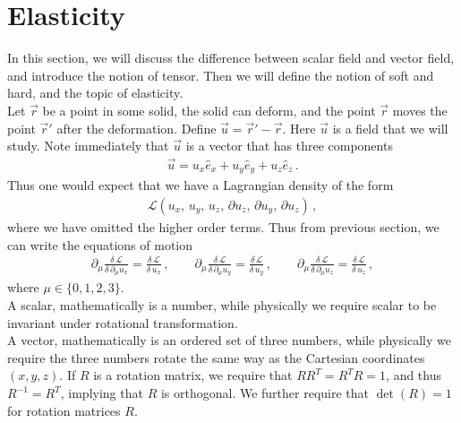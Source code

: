 \documentclass[11pt, onesided]{book}
\theoremstyle{break}
\theoremstyle{break}
\newcommand{\pd}{\partial}
\begin{document}
\section[Elasticity]{\color{red}Elasticity\color{black}}
In this section, we will discuss the difference between scalar field and vector field, and introduce the notion of tensor. Then we will define the notion of soft and hard, and the topic of elasticity.\\

Let $\vec{r}$ be a point in some solid, the solid can deform, and the point $\vec{r}$ moves the point $\vec{r}'$ after the deformation. Define $\vec{u} = \vec{r}' - \vec{r}$. Here $\vec{u}$ is a field that we will study. Note immediately that $\vec{u}$ is a vector that has three components
\begin{align*}
\vec{u} = u_x \hat{e}_x + u_y \hat{e}_y + u_z \hat{e}_z\,.
\end{align*}
Thus one would expect that we have a Lagrangian density of the form
\begin{align*}
\mathcal{L}(u_x,\, u_y,\, u_z,\, \pd u_z,\, \pd u_y,\, \pd u_z)\,,
\end{align*}
where we have omitted the higher order terms. Thus from previous section, we can write the equations of motion
\begin{align*}
\pd_\mu \frac{\delta \,\mathcal{L}}{\delta \, \pd_\mu u_x} = \frac{\delta \, \mathcal{L}}{\delta \, u_x}\,,\qquad
\pd_\mu \frac{\delta \,\mathcal{L}}{\delta \, \pd_\mu u_y} = \frac{\delta \, \mathcal{L}}{\delta \, u_y}\,,\qquad
\pd_\mu \frac{\delta \,\mathcal{L}}{\delta \, \pd_\mu u_z} = \frac{\delta \, \mathcal{L}}{\delta \, u_z}\,,
\end{align*}
where $\mu \in \{0,1,2,3\}$. \\

A scalar, mathematically is a number, while physically we require scalar to be invariant under rotational transformation.\\

A vector, mathematically is an ordered set of three numbers, while physically we require the three numbers rotate the same way as the Cartesian coordinates $(x,y,z)$. If $R$ is a rotation matrix, we require that $RR^T = R^TR = 1$, and thus $R^{-1} = R^T$, implying that $R$ is orthogonal. We further require that $\det(R) = 1$ for rotation matrices $R$. \\
\end{document}
